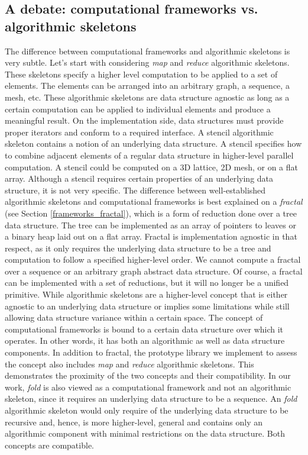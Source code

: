 \subsection{A debate: computational frameworks vs. algorithmic skeletons}
\label{background_frameworks_vs_skeletons}
\quad The difference between computational frameworks and algorithmic skeletons is very subtle. Let's start with considering \textit{map} and \textit{reduce} algorithmic skeletons. These skeletons specify a higher level computation to be applied to a set of elements. The elements can be arranged into an arbitrary graph, a sequence, a mesh, etc. These algorithmic skeletons are data structure agnostic as long as a certain computation can be applied to individual elements and produce a meaningful result. On the implementation side, data structures must provide proper iterators and conform to a required interface. A stencil algorithmic skeleton contains a notion of an underlying data structure. A stencil specifies how to combine adjacent elements of a regular data structure in higher-level parallel computation. A stencil could be computed on a 3D lattice, 2D mesh, or on a flat array. Although a stencil requires certain properties of an underlying data structure, it is not very specific.\newline\null
\quad The difference between well-established algorithmic skeletons and computational frameworks is best explained on a \textit{fractal} (see Section \ref{frameworks_fractal}), which is a form of reduction done over a tree data structure. The tree can be implemented as an array of pointers to leaves or a binary heap laid out on a flat array. Fractal is implementation agnostic in that respect, as it only requires the underlying data structure to be a tree and computation to follow a specified higher-level order. We cannot compute a fractal over a sequence or an arbitrary graph abstract data structure. Of course, a fractal can be implemented with a set of reductions, but it will no longer be a unified primitive.\newline\null
\quad While algorithmic skeletons are a higher-level concept that is either agnostic to an underlying data structure or implies some limitations while still allowing data structure variance within a certain space. The concept of computational frameworks is bound to a certain data structure over which it operates. In other words, it has both an algorithmic as well as data structure components.\newline\null
\quad In addition to fractal, the prototype library we implement to assess the concept also includes \textit{map} and \textit{reduce} algorithmic skeletons. This demonstrates the proximity of the two concepts and their compatibility. In our work, \textit{fold} is also viewed as a computational framework and not an algorithmic skeleton, since it requires an underlying data structure to be a sequence. An \textit{fold} algorithmic skeleton would only require of the underlying data structure to be recursive and, hence, is more higher-level, general and contains only an algorithmic component with minimal restrictions on the data structure. Both concepts are compatible.
